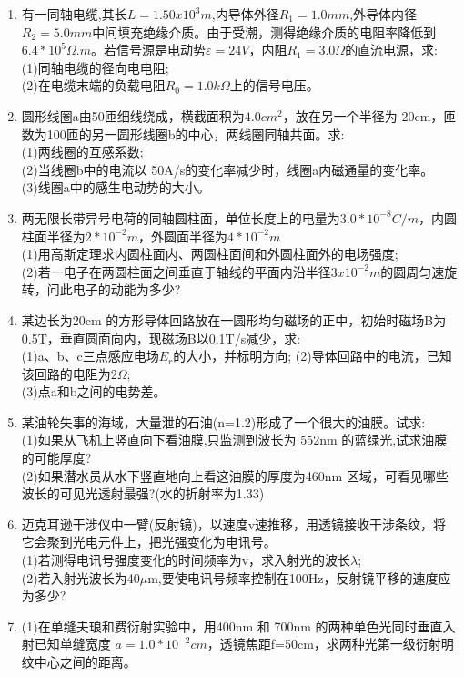 
\begin{enumerate}
\item 有一同轴电缆,其长$L=1.50x10^3m$,内导体外径$R_1=1.0mm$,外导体内径$R_2=5.0mm$中间填充绝缘介质。由于受潮，测得绝缘介质的电阻率降低到$6.4*10^5\Omega .m$。若信号源是电动势$\varepsilon=24V$，内阻$R_1=3.0\Omega$的直流电源，求:\\
(1)同轴电缆的径向电电阻;\\
(2)在电缆末端的负载电阻$R_0=1.0k \Omega$上的信号电压。
\item 圆形线圈a由50匝细线绕成，横截面积为$4.0cm^2$，放在另一个半径为 20cm，匝数为100匝的另一圆形线圈b的中心，两线圈同轴共面。求:\\
(1)两线圈的互感系数;\\
(2)当线圈b中的电流以 50A/s的变化率减少时，线圈a内磁通量的变化率。\\
(3)线圈a中的感生电动势的大小。
\item 两无限长带异号电荷的同轴圆柱面，单位长度上的电量为$3.0*10^{-8}C/m$，内圆柱面半径为$2*10^{-2}m$，外圆面半径为$4*10^{-2}m$\\
(1)用高斯定理求内圆柱面内、两圆柱面间和外圆柱面外的电场强度;\\
(2)若一电子在两圆柱面之间垂直于轴线的平面内沿半径$3x10^{-2}m$的圆周匀速旋转，问此电子的动能为多少?
\item 某边长为20cm 的方形导体回路放在一圆形均匀磁场的正中，初始时磁场B为 0.5T，垂直圆面向内，现磁场B以0.1T/s减少，求:\\
(1)a、b、c三点感应电场$E_r$的大小，并标明方向;
(2)导体回路中的电流，已知该回路的电阻为2$\Omega$;\\
(3)点a和b之间的电势差。
\item 某油轮失事的海域，大量泄的石油(n=1.2)形成了一个很大的油膜。试求:\\
(1)如果从飞机上竖直向下看油膜,只监测到波长为 552nm 的蓝绿光,试求油膜的可能厚度?\\
(2)如果潜水员从水下竖直地向上看这油膜的厚度为460nm 区域，可看见哪些波长的可见光透射最强?(水的折射率为1.33)
\item 迈克耳逊干涉仪中一臂(反射镜)，以速度v速推移，用透镜接收干涉条纹，将它会聚到光电元件上，把光强变化为电讯号。\\
(1)若测得电讯号强度变化的时间频率为v，求入射光的波长$\lambda$;\\
(2)若入射光波长为40$\mu$m,要使电讯号频率控制在100Hz，反射镜平移的速度应为多少?
\item (1)在单缝夫琅和费衍射实验中，用400nm 和 700nm 的两种单色光同时垂直入射已知单缝宽度 $a=1.0*10^{-2}cm$，透镜焦距f=50cm，求两种光第一级衍射明纹中心之间的距离。\\

\end{enumerate}
